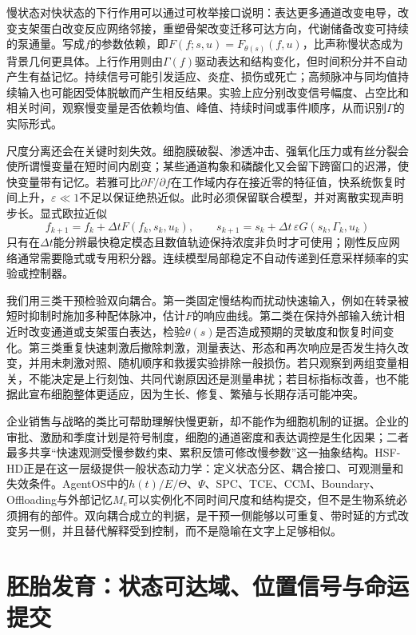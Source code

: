 慢状态对快状态的下行作用可以通过可枚举接口说明：表达更多通道改变电导，改变支架蛋白改变反应网络邻接，重塑骨架改变迁移可达方向，代谢储备改变可持续的泵通量。写成$f$的参数依赖，即$F(f;s,u)=F_{\theta(s)}(f,u)$，比声称慢状态成为背景几何更具体。上行作用则由$\Gamma(f)$驱动表达和结构变化，但时间积分并不自动产生有益记忆。持续信号可能引发适应、炎症、损伤或死亡；高频脉冲与同均值持续输入也可能因受体脱敏而产生相反结果。实验上应分别改变信号幅度、占空比和相关时间，观察慢变量是否依赖均值、峰值、持续时间或事件顺序，从而识别$\Gamma$的实际形式。

尺度分离还会在关键时刻失效。细胞膜破裂、渗透冲击、强氧化压力或有丝分裂会使所谓慢变量在短时间内剧变；某些通道构象和磷酸化又会留下跨窗口的迟滞，使快变量带有记忆。若雅可比$\partial F/\partial f$在工作域内存在接近零的特征值，快系统恢复时间上升，$\varepsilon\ll1$不足以保证绝热近似。此时必须保留联合模型，并对离散实现声明步长。显式欧拉近似
\begin{equation}
 f_{k+1}=f_k+\Delta t F(f_k,s_k,u_k),\qquad
 s_{k+1}=s_k+\Delta t\,\varepsilon G(s_k,\Gamma_k,u_k)
\end{equation}
只有在$\Delta t$能分辨最快稳定模态且数值轨迹保持浓度非负时才可使用；刚性反应网络通常需要隐式或专用积分器。连续模型局部稳定不自动传递到任意采样频率的实验或控制器。

我们用三类干预检验双向耦合。第一类固定慢结构而扰动快速输入，例如在转录被短时抑制时施加多种配体脉冲，估计$F$的响应曲线。第二类在保持外部输入统计相近时改变通道或支架蛋白表达，检验$\theta(s)$是否造成预期的灵敏度和恢复时间变化。第三类重复快速刺激后撤除刺激，测量表达、形态和再次响应是否发生持久改变，并用未刺激对照、随机顺序和救援实验排除一般损伤。若只观察到两组变量相关，不能决定是上行刻蚀、共同代谢原因还是测量串扰；若目标指标改善，也不能据此宣布细胞整体更适应，因为生长、修复、繁殖与长期存活可能冲突。

企业销售与战略的类比可帮助理解快慢更新，却不能作为细胞机制的证据。企业的审批、激励和季度计划是符号制度，细胞的通道密度和表达调控是生化因果；二者最多共享“快速观测受慢参数约束、累积反馈可修改慢参数”这一抽象结构。HSF-HD正是在这一层级提供一般状态动力学：定义状态分区、耦合接口、可观测量和失效条件。AgentOS中的$h(t)/E/\Theta$、$\Psi$、SPC、TCE、CCM、Boundary、Offloading与外部记忆$M_e$可以实例化不同时间尺度和结构提交，但不是生物系统必须拥有的部件。双向耦合成立的判据，是干预一侧能够以可重复、带时延的方式改变另一侧，并且替代解释受到控制，而不是隐喻在文字上足够相似。

\section{胚胎发育：状态可达域、位置信号与命运提交}
\label{sec:embryonic_development}


